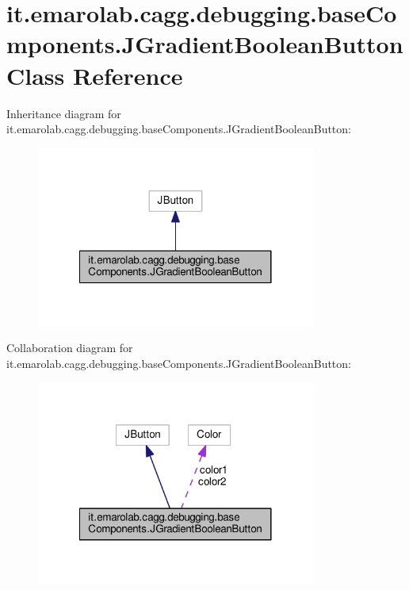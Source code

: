 \hypertarget{classit_1_1emarolab_1_1cagg_1_1debugging_1_1baseComponents_1_1JGradientBooleanButton}{\section{it.\-emarolab.\-cagg.\-debugging.\-base\-Components.\-J\-Gradient\-Boolean\-Button Class Reference}
\label{classit_1_1emarolab_1_1cagg_1_1debugging_1_1baseComponents_1_1JGradientBooleanButton}
}


Inheritance diagram for it.\-emarolab.\-cagg.\-debugging.\-base\-Components.\-J\-Gradient\-Boolean\-Button\-:\nopagebreak
\begin{figure}[H]
\begin{center}
\leavevmode
\includegraphics[width=260pt]{classit_1_1emarolab_1_1cagg_1_1debugging_1_1baseComponents_1_1JGradientBooleanButton__inherit__graph}
\end{center}
\end{figure}


Collaboration diagram for it.\-emarolab.\-cagg.\-debugging.\-base\-Components.\-J\-Gradient\-Boolean\-Button\-:\nopagebreak
\begin{figure}[H]
\begin{center}
\leavevmode
\includegraphics[width=260pt]{classit_1_1emarolab_1_1cagg_1_1debugging_1_1baseComponents_1_1JGradientBooleanButton__coll__graph}
\end{center}
\end{figure}
